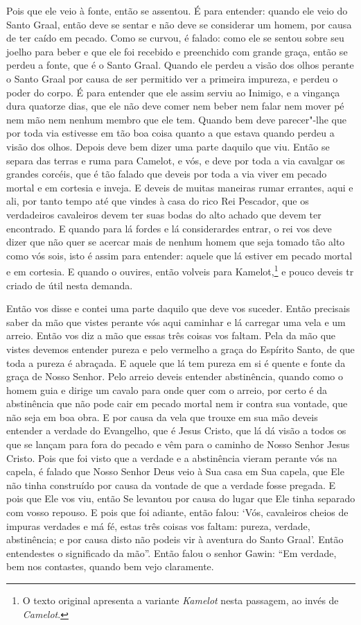 Pois que ele veio à fonte, então se assentou. É para entender: quando ele veio
do Santo Graal, então deve se sentar e não deve se considerar um homem, por
causa de ter caído em pecado. Como se curvou, é falado: como ele se sentou
sobre seu joelho para beber e que ele foi recebido e preenchido com grande
graça, então se perdeu a fonte, que é o Santo Graal. Quando ele perdeu a visão
dos olhos perante o Santo Graal por causa de ser permitido ver a primeira
impureza, e perdeu o poder do corpo. É para entender que ele assim serviu ao
Inimigo, e a vingança dura quatorze dias, que ele não deve comer nem beber nem
falar nem mover pé nem mão nem nenhum membro que ele tem. Quando bem deve
parecer"-lhe que por toda via estivesse em tão boa coisa quanto a que estava
quando perdeu a visão dos olhos. Depois deve bem dizer uma parte daquilo que
viu. Então se separa das terras e ruma para Camelot, e vós, e deve por toda a
via cavalgar os grandes corcéis, que é tão falado que deveis por toda a via
viver em pecado mortal e em cortesia e inveja. E deveis de muitas maneiras
rumar errantes, aqui e ali, por tanto tempo até que vindes à casa do rico Rei
Pescador, que os verdadeiros cavaleiros devem ter suas bodas do alto achado que
devem ter encontrado. E quando para lá fordes e lá considerardes entrar, o rei
vos deve dizer que não quer se acercar mais de nenhum homem que seja tomado tão
alto como vós sois, isto é assim para entender: aquele que lá estiver em pecado
mortal e em cortesia. E quando o ouvires, então volveis para Kamelot,\footnote{
O texto original apresenta a variante \textit{Kamelot} nesta passagem, ao invés
de \textit{Camelot}.} e pouco deveis tr criado de útil nesta demanda. 

 Então vos disse e contei uma parte daquilo que deve vos suceder. Então
precisais saber da mão que vistes perante vós aqui caminhar e lá carregar uma
vela e um arreio. Então vos diz a mão que essas três coisas vos faltam. Pela da
mão que vistes devemos entender pureza e pelo vermelho a graça do Espírito
Santo, de que toda a pureza é abraçada. E aquele que lá tem pureza em si é
quente e fonte da graça de Nosso Senhor. Pelo arreio deveis entender
abstinência, quando como o homem guia e dirige um cavalo para onde quer com o
arreio, por certo é da abstinência que não pode cair em pecado mortal nem ir
contra sua vontade, que não seja em boa obra. E por causa da vela que trouxe em
sua mão deveis entender a verdade do Evangelho, que é Jesus Cristo, que lá dá
visão a todos os que se lançam para fora do pecado e vêm para o caminho de
Nosso Senhor Jesus Cristo. Pois que foi visto que a verdade e a abstinência
vieram perante vós na capela, é falado que Nosso Senhor Deus veio à Sua casa em
Sua capela, que Ele não tinha construído por causa da vontade de que a verdade
fosse pregada. E pois que Ele vos viu, então Se levantou por causa do lugar que
Ele tinha separado com vosso repouso. E pois que foi adiante, então falou:
‘Vós, cavaleiros cheios de impuras verdades e má fé, estas três coisas vos
faltam: pureza, verdade, abstinência; e por causa disto não podeis vir à
aventura do Santo Graal’. Então entendestes o significado da mão”. 
Então falou o senhor Gawin: “Em verdade, bem nos contastes, quando
bem vejo claramente.

